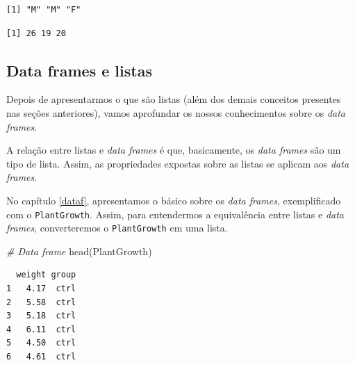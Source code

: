 \documentclass[
  brazilian,
]{book}
\newenvironment{Shaded}{\begin{snugshade}}{\end{snugshade}}
\newcommand{\CommentTok}[1]{\textcolor[rgb]{0.56,0.35,0.01}{\textit{#1}}}
\newcommand{\FunctionTok}[1]{\textcolor[rgb]{0.00,0.00,0.00}{#1}}
\newcommand{\NormalTok}[1]{#1}
\newcommand{\SpecialCharTok}[1]{\textcolor[rgb]{0.00,0.00,0.00}{#1}}
\begin{document}
\begin{Shaded}
\end{Shaded}

\begin{verbatim}
[1] "M" "M" "F"
\end{verbatim}

\begin{Shaded}
\end{Shaded}

\begin{verbatim}
[1] 26 19 20
\end{verbatim}

\hypertarget{df}{%
\subsection{Data frames e listas}\label{df}}

Depois de apresentarmos o que são listas (além dos demais conceitos presentes nas seções anteriores), vamos aprofundar os nossos conhecimentos sobre os \emph{data frames}.

A relação entre listas e \emph{data frames} é que, basicamente, os \emph{data frames} são um tipo de lista. Assim, as propriedades expostas sobre as listas se aplicam aos \emph{data frames}.

No capítulo \ref{dataf}, apresentamos o básico sobre os \emph{data frames}, exemplificado com o \texttt{PlantGrowth}. Assim, para entendermos a equivalência entre listas e \emph{data frames}, converteremos o \texttt{PlantGrowth} em uma lista.

\begin{Shaded}
\begin{Highlighting}[]
\CommentTok{\# Data frame}
\FunctionTok{head}\NormalTok{(PlantGrowth)}
\end{Highlighting}
\end{Shaded}

\begin{verbatim}
  weight group
1   4.17  ctrl
2   5.58  ctrl
3   5.18  ctrl
4   6.11  ctrl
5   4.50  ctrl
6   4.61  ctrl
\end{verbatim}
\end{document}
